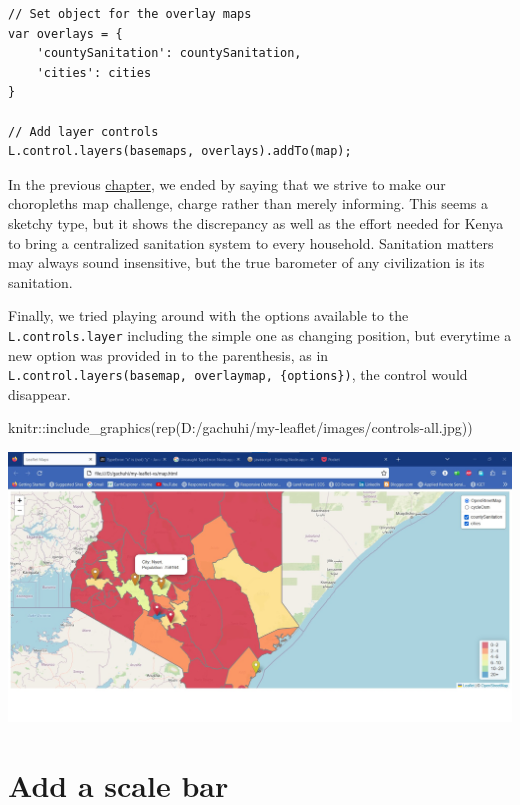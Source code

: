 \documentclass[
]{book}
\newenvironment{Shaded}{\begin{snugshade}}{\end{snugshade}}
\newcommand{\FunctionTok}[1]{\textcolor[rgb]{0.00,0.00,0.00}{#1}}
\newcommand{\NormalTok}[1]{#1}
\newcommand{\SpecialCharTok}[1]{\textcolor[rgb]{0.00,0.00,0.00}{#1}}
\newcommand{\StringTok}[1]{\textcolor[rgb]{0.31,0.60,0.02}{#1}}
\begin{document}
\begin{verbatim}
// Set object for the overlay maps
var overlays = {
    'countySanitation': countySanitation,
    'cities': cities
}

// Add layer controls
L.control.layers(basemaps, overlays).addTo(map);
\end{verbatim}

In the previous \protect\hyperlink{creating-an-interactive-choropleth-map}{chapter}, we ended by saying that we strive to make our choropleths map challenge, charge rather than merely informing. This seems a sketchy type, but it shows the discrepancy as well as the effort needed for Kenya to bring a centralized sanitation system to every household. Sanitation matters may always sound insensitive, but the true barometer of any civilization is its sanitation.

Finally, we tried playing around with the options available to the \texttt{L.controls.layer} including the simple one as changing position, but everytime a new option was provided in to the parenthesis, as in \texttt{L.control.layers(basemap,\ overlaymap,\ \{options\})}, the control would disappear.

\begin{Shaded}
\begin{Highlighting}[]
\NormalTok{knitr}\SpecialCharTok{::}\FunctionTok{include\_graphics}\NormalTok{(}\FunctionTok{rep}\NormalTok{(}\StringTok{\textquotesingle{}D:/gachuhi/my{-}leaflet/images/controls{-}all.jpg\textquotesingle{}}\NormalTok{))}
\end{Highlighting}
\end{Shaded}

\includegraphics[width=26.67in]{../images/controls-all}

\hypertarget{add-a-scale-bar}{%
\section{Add a scale bar}\label{add-a-scale-bar}}
\end{document}
